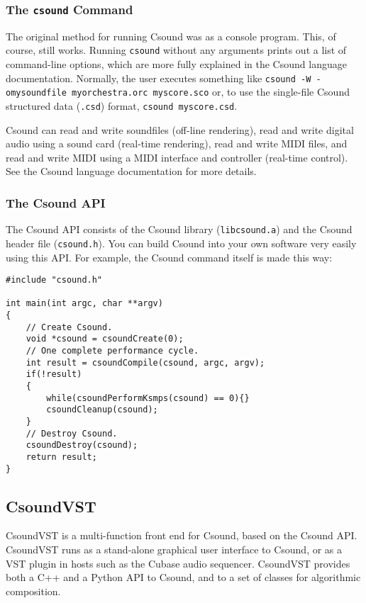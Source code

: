 \documentclass[10pt,letterpaper,onecolumn]{ltxguide}
\begin{document}
\subsubsection{The \texttt{csound} Command}

The original method for running Csound was as a console program. This, of course, still works. Running \texttt{csound} without any arguments prints out a list of command-line options, which are more fully explained in the Csound language documentation. Normally, the user executes something like \texttt{csound -W -omysoundfile myorchestra.orc myscore.sco} or, to use the single-file Csound structured data (\texttt{.csd}) format, \texttt{csound myscore.csd}.

Csound can read and write soundfiles (off-line rendering), read and write digital audio using a sound card (real-time rendering), read and write MIDI files, and read and write MIDI using a MIDI interface and controller (real-time control). See the Csound language documentation for more details. 

\subsubsection{The Csound API}

The Csound API consists of the Csound library (\texttt{libcsound.a}) and the Csound header file (\texttt{csound.h}). You can build Csound into your own software very easily using this API. For example, the Csound command itself is made this way:

\begin{verbatim}
#include "csound.h"

int main(int argc, char **argv)
{
    // Create Csound.
    void *csound = csoundCreate(0);
    // One complete performance cycle.
    int result = csoundCompile(csound, argc, argv);
    if(!result)
    {
        while(csoundPerformKsmps(csound) == 0){}
        csoundCleanup(csound);
    }
    // Destroy Csound.
    csoundDestroy(csound);
    return result;
}
\end{verbatim}

\subsection{CsoundVST}

CsoundVST is a multi-function front end for Csound, based on the Csound API. CsoundVST runs as a stand-alone graphical user interface to Csound, or as a VST plugin in hosts such as the Cubase audio sequencer. CsoundVST provides both a C++ and a Python API to Csound, and to a set of classes for algorithmic composition. 
\end{document}
